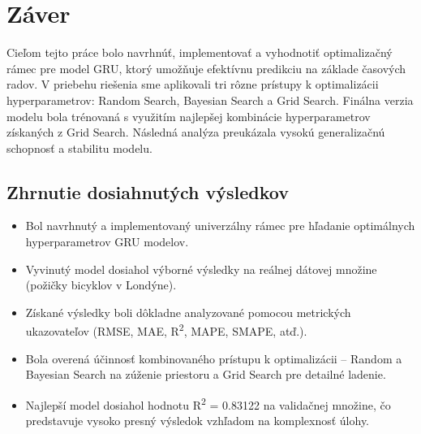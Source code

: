 % 
%  
% 
% 
% 
% 
% 
% 



\section{Záver}

Cieľom tejto práce bolo navrhnúť, implementovať a vyhodnotiť optimalizačný rámec pre model GRU, ktorý umožňuje efektívnu predikciu na základe časových radov. V priebehu riešenia sme aplikovali tri rôzne prístupy k optimalizácii hyperparametrov: Random Search, Bayesian Search a Grid Search. Finálna verzia modelu bola trénovaná s využitím najlepšej kombinácie hyperparametrov získaných z Grid Search. Následná analýza preukázala vysokú generalizačnú schopnosť a stabilitu modelu.

\subsection{Zhrnutie dosiahnutých výsledkov}

\begin{itemize}
\item Bol navrhnutý a implementovaný univerzálny rámec pre hľadanie optimálnych hyperparametrov GRU modelov.
\item Vyvinutý model dosiahol výborné výsledky na reálnej dátovej množine (požičky bicyklov v Londýne).
\item Získané výsledky boli dôkladne analyzované pomocou metrických ukazovateľov (RMSE, MAE, R\textsuperscript{2}, MAPE, SMAPE, atď.).
\item Bola overená účinnosť kombinovaného prístupu k optimalizácii – Random a Bayesian Search na zúženie priestoru a Grid Search pre detailné ladenie.
\item Najlepší model dosiahol hodnotu R\textsuperscript{2} = 0.83122 na validačnej množine, čo predstavuje vysoko presný výsledok vzhľadom na komplexnosť úlohy.
\end{itemize}

